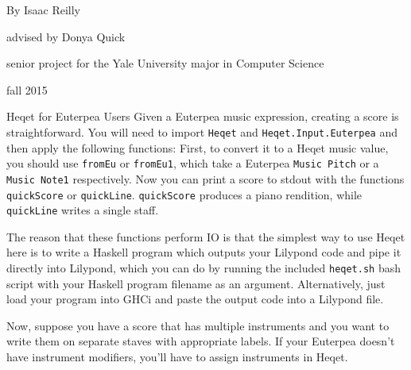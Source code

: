 \documentclass{article}
\begin{document}
\pagestyle{empty}
\begin{center}
\vspace{3cm}

\vspace{2cm}
{\Large By Isaac Reilly}

\vspace{0.15cm}
{\large advised by Donya Quick}

\vspace{0.1cm}
{senior project for the Yale University major in Computer Science}

\vspace{13cm}

{\small fall 2015}

\end{center}

\pagebreak

\tableofcontents
\newpage

\begin{section}{Heqet for Euterpea Users}
Given a Euterpea music expression, creating a score is
 straightforward. You will need to import \verb+Heqet+ 
 and \verb+Heqet.Input.Euterpea+ and then apply the following functions:
First, to convert it to a Heqet music value, 
you should use \verb+fromEu+ or \verb+fromEu1+, which take a Euterpea \verb+Music Pitch+ or a \verb+Music Note1+ respectively. Now you can print a score to
 stdout with the functions \verb+quickScore+ or \verb+quickLine+. \verb+quickScore+ produces a piano rendition, while \verb+quickLine+ writes a single staff. 
 
 The reason that these functions perform IO is that the 
 simplest way to use Heqet here is to write a Haskell program which outputs your Lilypond code and 
 pipe it directly into Lilypond, which you can do by running the included \verb+heqet.sh+ bash script with your Haskell program filename as an argument. Alternatively, just load your program into GHCi and paste the output code into a Lilypond file.

Now, suppose you have a score that has multiple instruments and you want to write them on separate staves with appropriate labels. If your Euterpea doesn't have instrument modifiers, you'll have to assign instruments in Heqet.
\end{section}
\end{document}
